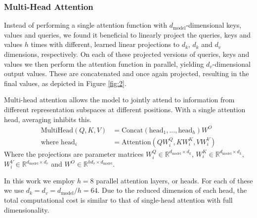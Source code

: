 \documentclass[conference]{IEEEtran}
\begin{document}
\subsubsection{Multi-Head Attention}
Instead of performing a single attention function with $d_{\text{model}}$-dimensional keys, values and queries, we found it beneficial to linearly project the queries, keys and values $h$ times with different, learned linear projections to $d_k$, $d_k$ and $d_v$ dimensions, respectively. On each of these projected versions of queries, keys and values we then perform the attention function in parallel, yielding $d_v$-dimensional output values. These are concatenated and once again projected, resulting in the final values, as depicted in Figure \ref{fig:2}.

Multi-head attention allows the model to jointly attend to information from different representation subspaces at different positions. With a single attention head, averaging inhibits this.
\begin{align*}
\text{MultiHead}(Q, K, V) &= \text{Concat}(\text{head}_1,..., \text{head}_h) W^O \\
\text{where head}_i &= \text{Attention}(QW^Q_i, KW^K_i, V W^V_i)
\end{align*}
Where the projections are parameter matrices $W^Q_i \in \mathbb{R}^{d_{\text{model}} \times d_k}$, $W^K_i \in \mathbb{R}^{d_{\text{model}} \times d_k}$, $W^V_i \in \mathbb{R}^{d_{\text{model}} \times d_v}$ and $W^O \in \mathbb{R}^{hd_v \times d_{\text{model}}}$.

In this work we employ $h = 8$ parallel attention layers, or heads. For each of these we use $d_k = d_v = d_{\text{model}}/h = 64$. Due to the reduced dimension of each head, the total computational cost is similar to that of single-head attention with full dimensionality.
\end{document}
